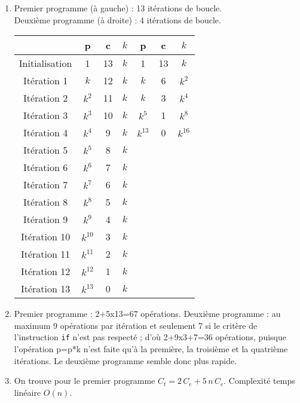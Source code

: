 \begin{enumerate}

\item Premier programme (à gauche) : 13 itérations de boucle.\\
Deuxième programme (à droite) : 4 itérations de boucle.
\begin{center}
\begin{tabular}{|c|c|c|c||c|c|c|}\hline
               & p        & c  & $k$ &  p        & c  & $k$\\\hline
Initialisation & 1        & 13 & $k$ &  1        & 13 & $k$ \\\hline
Itération 1    & $k$      & 12 & $k$ & $k$       &  6 & $k^2$\\\hline
Itération 2    & $k^2$    & 11 & $k$ & $k$       &  3 & $k^4$\\\hline
Itération 3    & $k^3$    & 10 & $k$ & $k^5$     &  1 & $k^8$\\\hline
Itération 4    & $k^4$    & 9  & $k$ & $k^{13}$  &  0 & $k^{16}$\\\hline
Itération 5    & $k^5$    & 8  & $k$ &&& \\\hline
Itération 6    & $k^6$    & 7  & $k$ &&& \\\hline
Itération 7    & $k^7$    & 6  & $k$ &&& \\\hline
Itération 8    & $k^8$    & 5  & $k$ &&& \\\hline
Itération 9    & $k^9$    & 4  & $k$ &&& \\\hline
Itération 10   & $k^{10}$ & 3  & $k$ &&& \\\hline
Itération 11   & $k^{11}$ & 2  & $k$ &&& \\\hline
Itération 12   & $k^{12}$ & 1  & $k$ &&& \\\hline
Itération 13   & $k^{13}$ & 0  & $k$ &&&\\\hline
\end{tabular}
\end{center}

\item Premier programme : 2+5x13=67 opérations. Deuxième programme : au maximum 9 opérations par itération et seulement 7 si le critère de l'instruction \texttt{if} n'est pas respecté ; d'où 2+9x3+7=36 opérations, puisque l'opération p=p*k n'est faite qu'à la première, la troisième et la quatrième itérations. Le deuxième programme semble donc plus rapide.

\item On trouve pour le premier programme $C_t= 2\,C_e +5\,n\,C_e$. Complexité temps linéaire $O(n)$.

\end{enumerate}
\newpage

